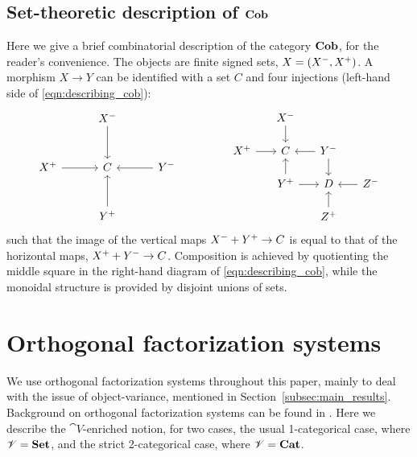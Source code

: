 \documentclass[11pt,oneside,article]{memoir}
\begin{document}
\subsection{Set-theoretic description of $\mathbf{Cob}$}

Here we give a brief combinatorial description of the category $\mathbf{Cob}$, for the reader's convenience. The objects
are finite signed sets, $X=(X^-,X^+)$. A morphism $X\to Y$ can be identified with a set $C$
and four injections (left-hand side of \eqref{eqn:describing_cob}):
\begin{equation}\label{eqn:describing_cob}
\begin{tikzcd}[row sep=1cm, column sep = 1cm]
   &\inp{X}\ar[d]\\
   \outp{X}\ar[r]&C&\inp{Y}\ar[l]\\
   &\outp{Y}\ar[u]
\end{tikzcd}
\hspace{.6in}
\begin{tikzcd}[row sep=.5cm, column sep =.5cm]
   &\inp{X}\ar[d]\\
   \outp{X}\ar[r]&C&\inp{Y}\ar[l]\ar[d]\\
   &\outp{Y}\ar[u]\ar[r]&D&\inp{Z}\ar[l]\\
   &&\outp{Z}\ar[u]
\end{tikzcd}
\end{equation}
such that the image of the vertical maps $X^-+Y^+\to C$ is equal to that of the horizontal
maps, $X^++Y^-\to C$. Composition is achieved by quotienting the middle square in the
right-hand diagram of \eqref{eqn:describing_cob}, while the monoidal structure is provided by
disjoint unions of sets.

\section{Orthogonal factorization systems}\label{sec:factorization_systems}

We use orthogonal factorization systems throughout this paper, mainly to deal with the issue of
object-variance, mentioned in Section~\ref{subsec:main_results}. Background on orthogonal
factorization systems can be found in \cite[Chapter 5.5]{BorceuxV1}. Here we describe the
$\cat{V}$-enriched notion, for two cases, the usual 1-categorical case, where $\mathscr{V}=\mathbf{Set}$, and
the strict 2-categorical case, where $\mathscr{V}=\mathbf{Cat}$.
\end{document}
